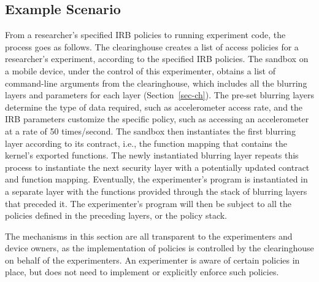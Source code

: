 \subsection{Example Scenario}\label{sec-detailed}

From a researcher's specified IRB policies to running experiment code, 
the process goes as follows. 
The clearinghouse creates a list of access policies for a researcher's
experiment, according to the specified IRB policies. The sandbox 
on a mobile device, under the control of
this experimenter, obtains a list of command-line arguments 
from the clearinghouse, which includes all the blurring layers
and parameters for each layer (Section~\ref{sec-ch}). The pre-set blurring layers determine
the type of data required, such as accelerometer access rate, and the 
IRB parameters customize the specific policy, such as accessing
an accelerometer at a rate of 50 times/second. 
The sandbox then %
instantiates 
the first blurring layer according to its contract, i.e., the function 
mapping that contains the kernel's exported functions.
The newly instantiated blurring layer repeats this process 
to instantiate the next
security layer with a potentially updated contract and function
mapping. Eventually, the experimenter's program is instantiated
in a separate layer with the functions provided
through the stack of blurring layers that preceded it.
The experimenter's program will then be subject to all the 
policies defined in the preceding layers, or the policy stack.

The mechanisms in this section are all transparent to the experimenters 
and device owners, as the implementation of policies is controlled by the 
clearinghouse on behalf of the experimenters. An experimenter is aware 
of certain policies in place, but does not need to implement or explicitly
enforce such policies. 
